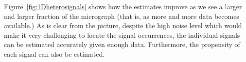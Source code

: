 \documentclass[english,11pt]{article}
\newcommand{\1}{\mathbf{1}}
\newcommand{\TODO}[1]{{\color{red}{[#1]}}}
\numberwithin{equation}{section}
\theoremstyle{plain}
\theoremstyle{definition}
\theoremstyle{remark}
\theoremstyle{plain}
\theoremstyle{remark}
\theoremstyle{plain}
\theoremstyle{plain}
\begin{document}
Figure~\ref{fig:1Dheterosignals} shows how the estimates improve as we see a larger and larger fraction of the micrograph (that is, as more and more data becomes available.) As is clear from the picture, despite the high noise level which would make it very challenging to locate the signal occurrences, the individual signals can be estimated accurately given enough data. Furthermore, the propensity of each signal can also be estimated.


%
%
\end{document}

